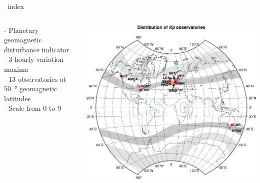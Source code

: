 \begin{frame}[plain,c]{\Kp~index}{}
	\begin{columns}[c]
		
		- Planetary geomagnetic disturbance indicator\\
		- 3-hourly variation maxima\\
		- 13 observatories at \SI{50}{\degree} geomagnetic latitudes\\
		- Scale from 0 to 9
		
		
		\includegraphics[width=\textwidth]{../figures_of_others/images/Kp_map.jpg}
	\end{columns}
\end{frame}
